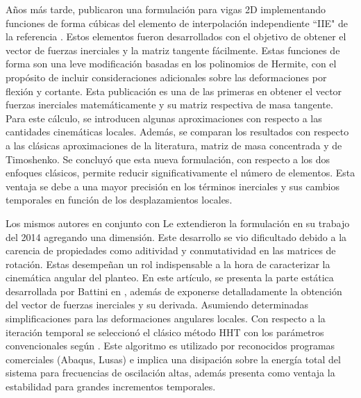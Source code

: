 Años más tarde, \cite{Le2011} publicaron una formulación para vigas 2D implementando funciones de forma cúbicas del elemento de interpolación independiente ``IIE" de la referencia  \cite{reddy1997locking}. Estos elementos fueron desarrollados con el objetivo de obtener el vector de fuerzas inerciales y la matriz tangente fácilmente. Estas funciones de forma son una leve modificación basadas en los polinomios de Hermite, con el propósito de incluir consideraciones adicionales sobre las deformaciones por flexión y cortante. Esta publicación es una de las primeras en obtener el vector fuerzas inerciales matemáticamente y su matriz respectiva de masa tangente. Para este cálculo, se introducen algunas aproximaciones con respecto a las cantidades cinemáticas locales. Además, se comparan los resultados con respecto a las clásicas aproximaciones de la literatura, matriz de masa concentrada y de Timoshenko. Se concluyó que esta nueva formulación, con respecto a los dos enfoques clásicos, permite reducir significativamente el número de elementos. Esta ventaja se debe a una mayor precisión en los términos inerciales y sus cambios temporales en función de los desplazamientos locales.    

Los mismos autores en conjunto con Le extendieron la formulación en su trabajo del 2014 \cite{Le2014} agregando una dimensión. Este desarrollo se vio dificultado debido a la carencia de propiedades como aditividad y conmutatividad en las matrices de rotación. Estas desempeñan un rol indispensable a la hora de caracterizar la cinemática angular del planteo. En este artículo, se presenta la parte estática desarrollada por Battini en \cite{Battini2002}, además de exponerse detalladamente la obtención del vector de fuerzas inerciales y su derivada. Asumiendo determinadas simplificaciones para las deformaciones angulares locales. Con respecto a la iteración temporal se seleccionó el clásico método \gls{HHT} con los parámetros convencionales según \cite{hilber1977improved}. Este algoritmo es utilizado por reconocidos programas comerciales (Abaqus, Lusas) e implica una disipación sobre la energía total del sistema para frecuencias de oscilación altas, además presenta como ventaja la estabilidad para grandes incrementos temporales. 

